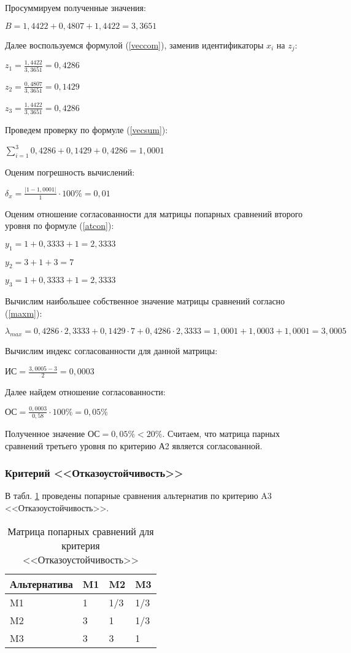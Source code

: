 Просуммируем полученные значения:

$B = 1,4422 + 0,4807 + 1,4422 = 3,3651$

Далее воспользуемся формулой (\ref{veccom}), заменив идентификаторы $x_i$ на $z_j$:

$z_1 = \frac{1,4422}{3,3651} = 0,4286$

$z_2 = \frac{0,4807}{3,3651} = 0,1429$

$z_3 = \frac{1,4422}{3,3651} = 0,4286$

Проведем проверку по формуле (\ref{vecsum}):

$\sum_{i=1}^{3} 0,4286 + 0,1429 + 0,4286 = 1,0001$

Оценим погрешность вычислений:

$\delta_{x} = \frac{|1 - 1,0001|}{1} \cdot 100\% = 0,01$

Оценим отношение согласованности для матрицы попарных сравнений второго уровня по формуле (\ref{atcon}):

$y_1 = 1 + 0,3333 + 1 = 2,3333$

$y_2 = 3 + 1 + 3 = 7$

$y_3 = 1 + 0,3333 + 1 = 2,3333$

Вычислим наибольшее собственное значение матрицы сравнений согласно (\ref{maxm}):

$\lambda_{max} = 0,4286 \cdot 2,3333 + 0,1429 \cdot 7 + 0,4286 \cdot 2,3333 = 1,0001 + 1,0003 + 1,0001 = 3,0005$

Вычислим индекс согласованности для данной матрицы:

$\text{ИС} = \frac{3,0005 - 3}{2} = 0,0003$

Далее найдем отношение согласованности:

$\text{ОС} = \frac{0,0003}{0,58} \cdot 100\% = 0,05\%$

Полученное значение $\text{ОС} = 0,05\% < 20\%$.
Считаем, что матрица парных сравнений третьего уровня по критерию А2 является согласованной.

\subsubsection{Критерий <<Отказоустойчивость>>}

В табл. \ref{fat} проведены попарные сравнения альтернатив по критерию A3 <<Отказоустойчивость>>.
\begin{table}[H]
  \caption{Матрица попарных сравнений для критерия <<Отказоустойчивость>>}\label{fat}
  \begin{tabular}{|l|l|l|l|}
  \hline Альтернатива & M1 & M2 & M3 \\
  \hline M1 & 1 & 1/3 & 1/3 \\
  \hline M2 & 3 & 1 & 1/3 \\
  \hline M3 & 3 & 3 & 1 \\
  \hline
  \end{tabular}
\end{table}

